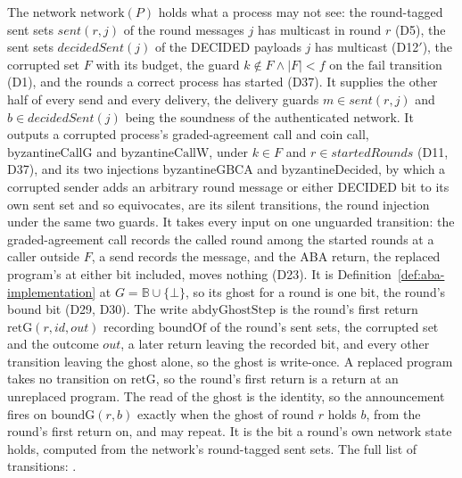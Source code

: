 \begin{definition}
  \label{def:aba-network}
  \leanok
  The network $\mathrm{network}(P)$ holds what a process may not see: the round-tagged sent sets $sent(r,j)$ of the round messages $j$ has multicast in round $r$ (D5), the sent sets $decidedSent(j)$ of the DECIDED payloads $j$ has multicast (D12$'$), the corrupted set $F$ with its budget, the guard $k \notin F \wedge |F| < f$ on the $\mathrm{fail}$ transition (D1), and the rounds a correct process has started (D37).
  It supplies the other half of every send and every delivery, the delivery guards $m \in sent(r,j)$ and $b \in decidedSent(j)$ being the soundness of the authenticated network.
  It outputs a corrupted process's graded-agreement call and coin call, $\mathrm{byzantineCallG}$ and $\mathrm{byzantineCallW}$, under $k \in F$ and $r \in \mathit{startedRounds}$ (D11, D37), and its two injections $\mathrm{byzantineGBCA}$ and $\mathrm{byzantineDecided}$, by which a corrupted sender adds an arbitrary round message or either DECIDED bit to its own sent set and so equivocates, are its silent transitions, the round injection under the same two guards.
  It takes every input on one unguarded transition: the graded-agreement call records the called round among the started rounds at a caller outside $F$, a send records the message, and the ABA return, the replaced program's at either bit included, moves nothing (D23).
  It is Definition~\ref{def:aba-implementation} at $G = \mathbb{B} \cup \{\bot\}$, so its ghost for a round is one bit, the round's bound bit (D29, D30).
  The write $\mathrm{abdyGhostStep}$ is the round's first return $\mathrm{retG}(r,id,out)$ recording $\mathrm{boundOf}$ of the round's sent sets, the corrupted set and the outcome $out$, a later return leaving the recorded bit, and every other transition leaving the ghost alone, so the ghost is write-once.
  A replaced program takes no transition on $\mathrm{retG}$, so the round's first return is a return at an unreplaced program.
  The read of the ghost is the identity, so the announcement  fires on $\mathrm{boundG}(r,b)$ exactly when the ghost of round $r$ holds $b$, from the round's first return on, and may repeat.
  It is the bit a round's own network state holds, computed from the network's round-tagged sent sets.
  The full list of transitions: .
\end{definition}
